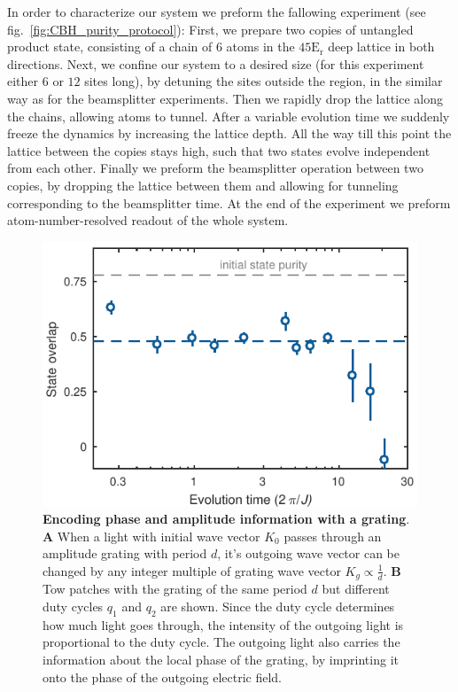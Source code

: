 

In order to characterize our system we preform the fallowing experiment (see fig.~\ref{fig:CBH_purity_protocol}): First, we prepare two copies of untangled product state, consisting of a chain of $6$ atoms in the $45\mathrm{E_r}$ deep lattice in both directions. Next, we confine our system to a desired size (for this experiment either $6$ or $12$ sites long), by detuning the sites outside the region, in the similar way as for the beamsplitter experiments. Then we rapidly drop the lattice along the chains, allowing atoms to tunnel. After a variable evolution time we suddenly freeze the dynamics by increasing the lattice depth. All the way till this point the lattice between the copies stays high, such that two states evolve independent from each other. Finally we preform the beamsplitter operation between two copies, by dropping the lattice between them and allowing for tunneling corresponding to the beamsplitter time. At the end of the experiment we preform atom-number-resolved readout of the whole system.

\begin{figure}[t]
	\centering
	\includegraphics[scale=1]{figures/CBH_MBP_single_trace.pdf}
	\caption{{\bf Encoding phase and amplitude information with a grating}. {\bf A} When a light with initial wave vector $K_0$ passes through an amplitude grating with period $d$, it's outgoing wave vector can be changed by any integer multiple of grating wave vector $K_g\propto \frac{1}{d}$. {\bf B} Tow patches with the grating of the same period $d$ but different duty cycles $q_1$ and $q_2$ are shown. Since the duty cycle determines how much light goes through, the intensity of the outgoing light is proportional to the duty cycle. The outgoing light also carries the information about the local phase of the grating, by imprinting it onto the phase of the outgoing electric field.}
	\label{fig:CBH_MBP_vs_time}
\end{figure}

